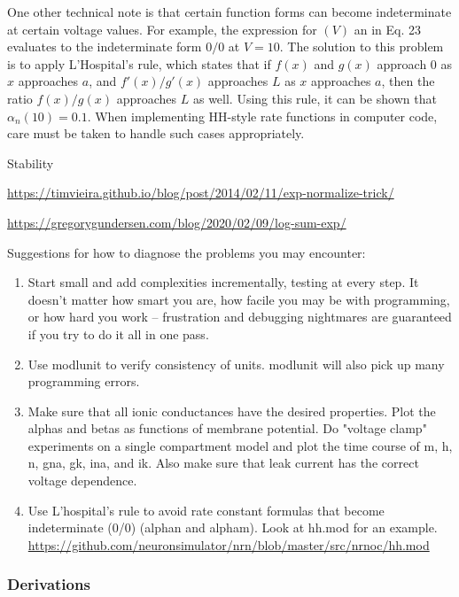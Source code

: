One other technical note is that certain function forms can become indeterminate at
certain voltage values. For example, the expression for $(V)$ an in Eq. 23 evaluates to the indeterminate form $0/0$ at $V=10$. The solution to this problem is to apply L’Hospital’s rule, which states that if $f(x)$ and $g(x)$ approach $0$ as $x$ approaches $a$, and $f'(x)/ g'( x)$ approaches $L$ as $x$ approaches $a$, then the ratio $f (x)/ g( x)$ approaches $L$ as well. Using this rule, it can be shown
that $\alpha_n (10) = 0.1$. When implementing HH-style rate functions in computer code, care must be taken to handle such cases appropriately.

Stability

\url{https://timvieira.github.io/blog/post/2014/02/11/exp-normalize-trick/}

\url{https://gregorygundersen.com/blog/2020/02/09/log-sum-exp/}


Suggestions for how to diagnose the problems you may encounter:

\begin{enumerate}
    \item Start small and add complexities incrementally, testing at every step. It doesn't matter how smart you are, how facile you may be with programming, or how hard you work -- frustration and debugging nightmares are guaranteed if you try to do it all in one pass.
    \item Use modlunit to verify consistency of units. modlunit will also pick up many programming errors.
    \item Make sure that all ionic conductances have the desired properties. Plot the alphas and betas as functions of membrane potential. Do "voltage clamp" experiments on a single compartment model and plot the time course of m, h, n, gna, gk, ina, and ik. Also make sure that leak current has the correct voltage dependence.
    \item Use L'hospital's rule to avoid rate constant formulas that become indeterminate (0/0) (alphan and alpham). Look at hh.mod for an example. \url{https://github.com/neuronsimulator/nrn/blob/master/src/nrnoc/hh.mod}
\end{enumerate}


\subsubsection{Derivations}

